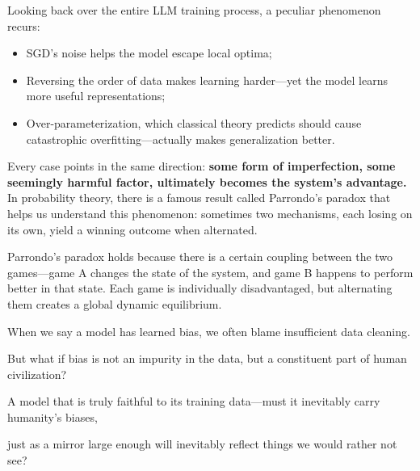 \vspace{1em}

Looking back over the entire LLM training process, a peculiar phenomenon recurs:

\begin{itemize}
\item SGD's noise helps the model escape local optima;


\item Reversing the order of data makes learning harder---yet the model learns more useful representations;

\item Over-parameterization, which classical theory predicts should cause catastrophic overfitting---actually makes generalization better.
\end{itemize}

\vspace{1em}

Every case points in the same direction: \textbf{some form of imperfection, some seemingly harmful factor, ultimately becomes the system's advantage.}
In probability theory, there is a famous result called Parrondo's paradox that helps us understand this phenomenon: sometimes two mechanisms, each losing on its own, yield a winning outcome when alternated.

Parrondo's paradox holds because there is a certain coupling between the two games---game A changes the state of the system, and game B happens to perform better in that state. Each game is individually disadvantaged, but alternating them creates a global dynamic equilibrium.


\begin{thinkbox}
When we say a model has learned bias, we often blame insufficient data cleaning.

But what if bias is not an impurity in the data, but a constituent part of human civilization?

A model that is truly faithful to its training data---must it inevitably carry humanity's biases,

just as a mirror large enough will inevitably reflect things we would rather not see?
\end{thinkbox}



